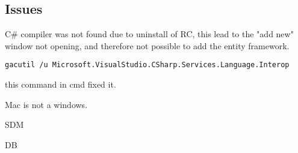 \subsection{Issues}
C# compiler was not found due to uninstall of RC, this lead to the "add new" window not opening, and therefore not possible to add the entity framework.
\begin{verbatim}
gacutil /u Microsoft.VisualStudio.CSharp.Services.Language.Interop 
\end{verbatim} this command in cmd fixed it.

Mac is not a windows.

SDM

DB
